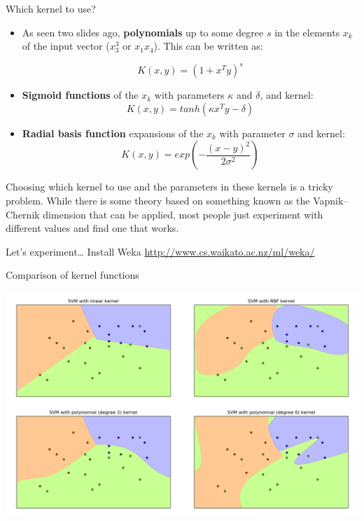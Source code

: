 \documentclass[compress]{beamer}
\begin{document}
\begin{frame}{Which kernel to use?}

\begin{itemize}

    \item As seen two slides ago, \textbf{polynomials} up to some degree $s$ in the
  elements $x_k$ of the input vector (\eg $x^3_3$ or $x_1 x_4$). This can be written as:

    \[
        K(x, y) = (1 + x^Ty)^s
    \]

\item \textbf{Sigmoid functions} of the $x_k$ with parameters $\kappa$ and $\delta$, and
  kernel:
    \[
        K(x, y) = tanh(\kappa x^T y - \delta)
    \]
\item \textbf{Radial basis function} expansions of the $x_k$ with parameter $\sigma$
  and kernel:
    \[
        K(x, y) = exp(- \frac{(x-y)^2}{2\sigma^2})
    \]

\end{itemize}



Choosing which kernel to use and the parameters in these kernels is a
  tricky problem. While there is some theory based on something known as
  the Vapnik--Chernik dimension that can be applied, most people just
  experiment with different values and find one that works.

Let's experiment\ldots{} Install Weka
  \url{http://www.cs.waikato.ac.nz/ml/weka/}

\end{frame}

\begin{frame}{Comparison of kernel functions}
    \begin{center}
        \includegraphics[width=\linewidth]{svm_comparison}
    \end{center}
\end{frame}
\end{document}

